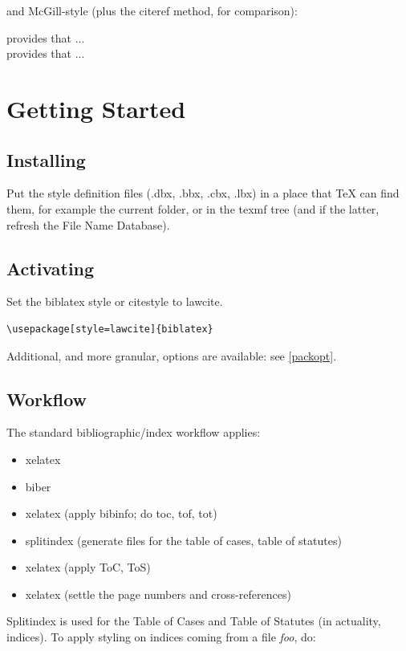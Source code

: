 and McGill-style (plus the citeref method, for comparison): \lcsetstylemcgill

\begin{mdframed}[default]
 provides that ...\\
 provides that ...
\end{mdframed}
\bigskip

\lcsetstyledefault

\section{Getting Started}
\subsection{Installing}
Put the style definition files (.dbx, .bbx, .cbx, .lbx) in a place that TeX can find them, for example the current folder, or in the texmf tree (and if the latter, refresh the File Name Database).

\subsection{Activating}
Set the biblatex style or citestyle to lawcite.

\begin{verbatim}
\usepackage[style=lawcite]{biblatex}
\end{verbatim}
Additional, and more granular, options are available: see \autoref{packopt}.


\subsection{Workflow}
The standard bibliographic/index workflow applies:
\begin{itemize}
\item xelatex
\item biber
\item xelatex (apply bibinfo; do toc, tof, tot)
\item splitindex (generate files for the table of cases, table of statutes)
\item  xelatex (apply ToC, ToS)
\item xelatex (settle the page numbers and cross-references)
\end{itemize}

Splitindex is used for the Table of Cases and Table of Statutes (in actuality, indices). To apply styling on indices coming from a file \textit{foo}, do: 

